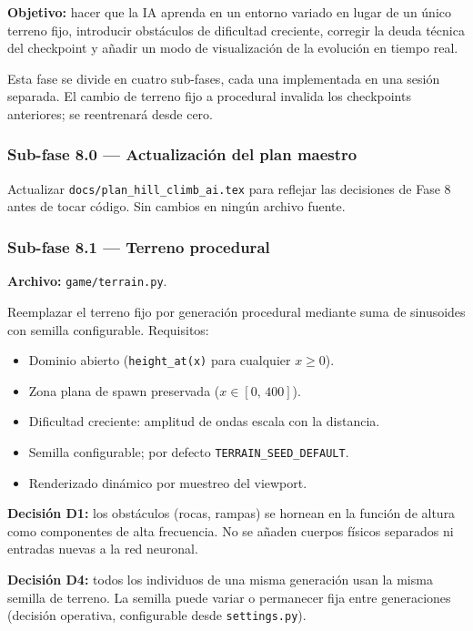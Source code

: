 \documentclass[11pt,a4paper]{article}
\begin{document}
\textbf{Objetivo:} hacer que la IA aprenda en un entorno variado en lugar de un
único terreno fijo, introducir obstáculos de dificultad creciente, corregir la
deuda técnica del checkpoint y añadir un modo de visualización de la evolución
en tiempo real.

Esta fase se divide en cuatro sub-fases, cada una implementada en una sesión
separada. El cambio de terreno fijo a procedural invalida los checkpoints
anteriores; se reentrenará desde cero.

\subsubsection*{Sub-fase 8.0 --- Actualización del plan maestro}

Actualizar \texttt{docs/plan\_hill\_climb\_ai.tex} para reflejar las decisiones
de Fase 8 antes de tocar código. Sin cambios en ningún archivo fuente.

\subsubsection*{Sub-fase 8.1 --- Terreno procedural}

\textbf{Archivo:} \texttt{game/terrain.py}.

Reemplazar el terreno fijo por generación procedural mediante suma de
sinusoides con semilla configurable. Requisitos:
\begin{itemize}
    \item Dominio abierto (\texttt{height\_at(x)} para cualquier $x \geq 0$).
    \item Zona plana de spawn preservada ($x \in [0,\,400]$).
    \item Dificultad creciente: amplitud de ondas escala con la distancia.
    \item Semilla configurable; por defecto \texttt{TERRAIN\_SEED\_DEFAULT}.
    \item Renderizado dinámico por muestreo del viewport.
\end{itemize}

\textbf{Decisión D1:} los obstáculos (rocas, rampas) se hornean en la función de
altura como componentes de alta frecuencia. No se añaden cuerpos físicos
separados ni entradas nuevas a la red neuronal.

\textbf{Decisión D4:} todos los individuos de una misma generación usan la misma
semilla de terreno. La semilla puede variar o permanecer fija entre generaciones
(decisión operativa, configurable desde \texttt{settings.py}).
\end{document}
